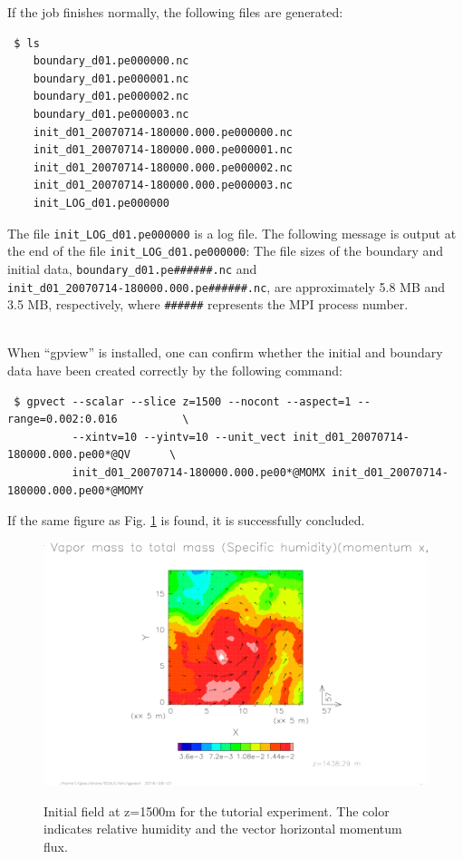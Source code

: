 If the job finishes normally, the following files are generated:
\begin{verbatim}
 $ ls
    boundary_d01.pe000000.nc
    boundary_d01.pe000001.nc
    boundary_d01.pe000002.nc
    boundary_d01.pe000003.nc
    init_d01_20070714-180000.000.pe000000.nc
    init_d01_20070714-180000.000.pe000001.nc
    init_d01_20070714-180000.000.pe000002.nc
    init_d01_20070714-180000.000.pe000003.nc
    init_LOG_d01.pe000000
\end{verbatim}
The file \verb|init_LOG_d01.pe000000| is a log file.  The following message is output at the end of the file \verb|init_LOG_d01.pe000000|:
The file sizes of the boundary and initial data, \verb|boundary_d01.pe######.nc| and \\
\verb|init_d01_20070714-180000.000.pe######.nc|, are approximately 5.8 MB and 3.5 MB, respectively,  where \verb|######| represents the MPI process number.

\vspace{1cm}
 \hrulefill \\
When ``gpview'' is installed,  one can confirm whether the initial and boundary data have been created correctly  by the following command:
\begin{verbatim}
 $ gpvect --scalar --slice z=1500 --nocont --aspect=1 --range=0.002:0.016          \
          --xintv=10 --yintv=10 --unit_vect init_d01_20070714-180000.000.pe00*@QV      \
          init_d01_20070714-180000.000.pe00*@MOMX init_d01_20070714-180000.000.pe00*@MOMY
\end{verbatim}
If the same figure as Fig. \ref{fig:init} is found, it is successfully concluded.

\begin{figure}[h]
\begin{center}
  \includegraphics[width=0.9\hsize]{./figure/real_init_qv-momxy.png}\\
  \caption{Initial field at z=1500m for the tutorial experiment.
    The color indicates relative humidity and the vector horizontal momentum flux.}
  \label{fig:init}
\end{center}
\end{figure}
